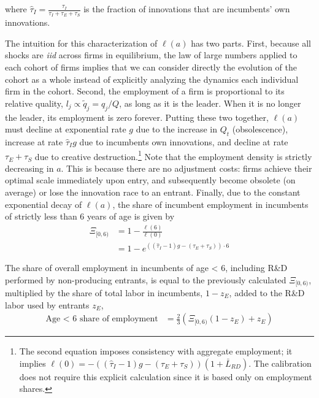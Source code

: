 \documentclass[11pt,english]{article}
\theoremstyle{remark}
\begin{document}
where $\hat{\tau}_I = \frac{\tau_I}{\tau_I + \tau_E + \tau_S}$ is the fraction of innovations that are incumbents' own innovations. 

The intuition for this characterization of $\ell(a)$ has two parts. First, because all shocks are \textit{iid} across firms in equilibrium, the law of large numbers applied to each cohort of firms implies that we can consider directly the evolution of the cohort as a whole instead of explicitly analyzing the dynamics each individual firm in the cohort.  Second, the employment of a firm is proportional to its relative quality, $l_j \propto \tilde{q}_j = q_j / Q$, as long as it is the leader. When it is no longer the leader, its employment is zero forever. Putting these two together, $\ell(a)$ must decline at exponential rate $g$ due to the increase in $Q_t$ (obsolescence), increase at rate $\hat{\tau}_I g$ due to incumbents own innovations, and decline at rate $\tau_E + \tau_S$ due to creative destruction.\footnote{The second equation imposes consistency with aggregate employment; it implies $\ell(0) = -((\hat{\tau}_I -1)g - (\tau_E + \tau_S))(1 + \bar{L}_{RD})$. The calibration does not require this explicit calculation since it is based only on employment shares.} Note that the employment density is strictly decreasing in $a$. This is because there are no adjustment costs: firms achieve their optimal scale immediately upon entry, and subsequently become obsolete (on average) or lose the innovation race to an entrant. Finally, due to the constant exponential decay of $\ell(a)$, the share of incumbent employment in incumbents of strictly less than 6 years of age is given by 
\begin{align*}
\Xi_{[0,6)} &=  1 - \frac{\ell(6)}{\ell(0)} \\
&= 1 - e^{((\hat{\tau}_I -1)g - (\tau_E + \tau_S))\cdot 6}
\end{align*}  


The share of overall employment in incumbents of age < 6, including R\&D performed by non-producing entrants, is equal to the previously calculated $\Xi_{[0,6)}$, multiplied by the share of total labor in incumbents, $1 - z_E$, added to the R\&D labor used by entrants $z_E$, 
\begin{align*}
\textrm{Age < 6 share of employment} &= \frac{2}{3}(\Xi_{[0,6)} (1-z_E) + z_E)
\end{align*}
\end{document}
